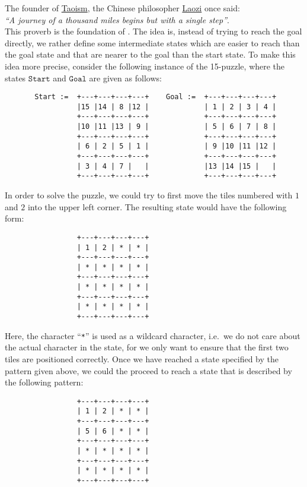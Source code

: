 \exercise
The founder of \href{https://en.wikipedia.org/wiki/Taoism}{Taoism}, the Chinese philosopher
\href{https://en.wikipedia.org/wiki/Laozi}{Laozi} once said: 
\\[0.2cm]
\hspace*{1.3cm}
\textsl{``A journey of a thousand miles begins but with a single step''}.
\\[0.2cm]
This proverb is the foundation of .  The idea is, instead of trying to reach
the goal directly, we rather define some intermediate states which are easier to reach than the goal state and
that are nearer to the goal than the start state.  To make this idea more precise, consider the following instance of the
15-puzzle, where the states $\mathtt{Start}$ and $\mathtt{Goal}$ are given as follows:
\begin{verbatim}
       Start :=  +---+---+---+---+    Goal :=  +---+---+---+---+
                 |15 |14 | 8 |12 |             | 1 | 2 | 3 | 4 |
                 +---+---+---+---+             +---+---+---+---+
                 |10 |11 |13 | 9 |             | 5 | 6 | 7 | 8 |
                 +---+---+---+---+             +---+---+---+---+
                 | 6 | 2 | 5 | 1 |             | 9 |10 |11 |12 |
                 +---+---+---+---+             +---+---+---+---+
                 | 3 | 4 | 7 |   |             |13 |14 |15 |   |
                 +---+---+---+---+             +---+---+---+---+
\end{verbatim}
In order to solve the puzzle, we could try to first move the tiles numbered with $1$ and $2$ into the upper left
corner.  The resulting state would have the following form:
\begin{verbatim}
                 +---+---+---+---+
                 | 1 | 2 | * | * |
                 +---+---+---+---+
                 | * | * | * | * |
                 +---+---+---+---+
                 | * | * | * | * |
                 +---+---+---+---+
                 | * | * | * | * |
                 +---+---+---+---+
\end{verbatim}
Here, the character ``\texttt{*}'' is used as a wildcard character, i.e.~we do not care about the actual
character in the state, for we only want to ensure that the first two tiles are positioned correctly.  Once we have reached a
state specified by the pattern given above, we could the proceed to reach a state that is described by the
following pattern:
\begin{verbatim}
                 +---+---+---+---+
                 | 1 | 2 | * | * |
                 +---+---+---+---+
                 | 5 | 6 | * | * |
                 +---+---+---+---+
                 | * | * | * | * |
                 +---+---+---+---+
                 | * | * | * | * |
                 +---+---+---+---+
\end{verbatim}

